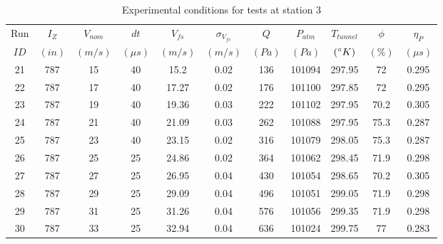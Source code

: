 \begin{table}[H]
\begin{center}
\begin{tabular}{|ccccccccccc|}
	\hline
	Run & $I_Z$ & $V_{nom}$ & $dt$ & $V_{fs}$ & $\sigma_{V_{fs}}$ & $Q$ & $P_{atm}$ & $T_{tunnel}$ & $\phi$ & $\eta_P$\\
	$ID$ & $(in)$ & $(m/s)$ & $(\mu s)$ & $(m/s)$ & $(m/s)$ & $(Pa)$ & $(Pa)$ & $(\degree K)$ & $(\%)$ & $(\mu s)$\\
	\hline
	21 & 787 & 15 & 40 & 15.2 & 0.02 & 136 & 101094 & 297.95 & 72 & 0.295\\
	22 & 787 & 17 & 40 & 17.27 & 0.02 & 176 & 101100 & 297.85 & 72 & 0.295\\
	23 & 787 & 19 & 40 & 19.36 & 0.03 & 222 & 101102 & 297.95 & 70.2 & 0.305\\
	24 & 787 & 21 & 40 & 21.09 & 0.03 & 262 & 101088 & 297.95 & 75.3 & 0.287\\
	25 & 787 & 23 & 40 & 23.15 & 0.02 & 316 & 101079 & 298.05 & 75.3 & 0.287\\
	26 & 787 & 25 & 25 & 24.86 & 0.02 & 364 & 101062 & 298.45 & 71.9 & 0.298\\
	27 & 787 & 27 & 25 & 26.95 & 0.04 & 430 & 101054 & 298.65 & 70.2 & 0.305\\
	28 & 787 & 29 & 25 & 29.09 & 0.04 & 496 & 101051 & 299.05 & 71.9 & 0.298\\
	29 & 787 & 31 & 25 & 31.26 & 0.04 & 576 & 101056 & 299.35 & 71.9 & 0.298\\
	30 & 787 & 33 & 25 & 32.94 & 0.04 & 636 & 101024 & 299.75 & 77 & 0.283\\
	\hline
\end{tabular}
\caption{Experimental conditions for tests at station 3}
\label{table:station_3_measurements.}
\end{center}
\end{table}
